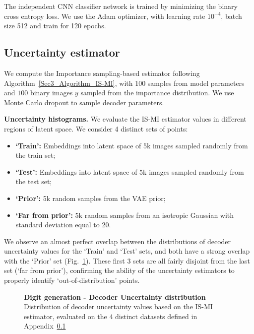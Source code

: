 The independent CNN classifier network is trained by minimizing the binary cross entropy loss. We use the Adam optimizer, with learning rate $10^{-4}$, batch size 512 and train for 120 epochs.

\subsection{Uncertainty estimator}
\label{Appendix_B.3_Digit_generation_Uncertainty_estimator}

We compute the Importance sampling-based estimator following Algorithm~\ref{Sec3_Algorithm_IS-MI}, with $100$ samples from model parameters and $100$ binary images $y$ sampled from the importance distribution. We use Monte Carlo dropout \cite{gal2016dropout} to sample decoder parameters. 

\textbf{Uncertainty histograms. } We evaluate the IS-MI estimator values in different regions of latent space. We consider 4 distinct sets of points:
\vspace{-2mm}
\begin{itemize}
\setlength\itemsep{0em}
    \item \textbf{`Train':} Embeddings into latent space of 5k images sampled randomly from the train set;
    \item \textbf{`Test':} Embeddings into latent space of 5k images sampled randomly from the test set;
    \item \textbf{`Prior':} 5k random samples from the VAE prior;
    \item \textbf{`Far from prior':} 5k random samples from an isotropic Gaussian with standard deviation equal to 20.
\end{itemize}

We observe an almost perfect overlap between the distributions of decoder uncertainty values for the `Train' and `Test' sets, and both have a strong overlap with the `Prior' set (Fig.~\ref{Appendix_Fig_Digit_generation_histogram}). These first 3 sets are all fairly disjoint from the last set (`far from prior'), confirming the ability of the uncertainty estimators to properly identify `out-of-distribution' points.

\begin{figure}[ht]
\vspace{0pt}
\begin{center}
\end{center}
\caption{\textbf{Digit generation - Decoder Uncertainty distribution} Distribution of decoder uncertainty values based on the IS-MI estimator, evaluated on the 4 distinct datasets defined in Appendix~\ref{Appendix_B.3_Digit_generation_Uncertainty_estimator}}
\label{Appendix_Fig_Digit_generation_histogram}
\end{figure}


